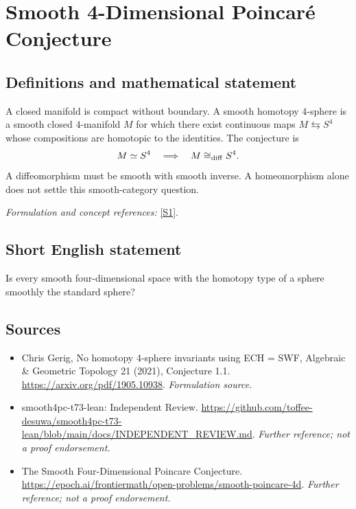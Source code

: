 \documentclass[11pt]{article}
\begin{document}
\section*{\texorpdfstring{Smooth 4-Dimensional Poincaré Conjecture}{Smooth 4-Dimensional Poincaré Conjecture}}\label{18}
\subsection{Definitions and mathematical statement}
A closed manifold is compact without boundary. A smooth homotopy $4$-sphere is a smooth closed $4$-manifold $M$ for which there exist continuous maps $M\leftrightarrows S^4$ whose compositions are homotopic to the identities. The conjecture is
\[
 M\simeq S^4\quad\Longrightarrow\quad M\cong_{\rm diff} S^4.
\]
A diffeomorphism must be smooth with smooth inverse. A homeomorphism alone does not settle this smooth-category question.
\par\smallskip\textit{Formulation and concept references:} \href{https://arxiv.org/pdf/1905.10938}{[S1]}.

\subsection{Short English statement}
Is every smooth four-dimensional space with the homotopy type of a sphere smoothly the standard sphere?
\subsection{Sources}
\begin{itemize}
\item[S1]Chris Gerig, No homotopy 4-sphere invariants using ECH = SWF, Algebraic \& Geometric Topology 21 (2021), Conjecture 1.1.
\url{https://arxiv.org/pdf/1905.10938}.
\textit{Formulation source.}
\item[S2]smooth4pc-t73-lean: Independent Review.
\url{https://github.com/toffee-desuwa/smooth4pc-t73-lean/blob/main/docs/INDEPENDENT_REVIEW.md}.
\textit{Further reference; not a proof endorsement.}
\item[S3]The Smooth Four-Dimensional Poincare Conjecture.
\url{https://epoch.ai/frontiermath/open-problems/smooth-poincare-4d}.
\textit{Further reference; not a proof endorsement.}
\end{itemize}
\end{document}
